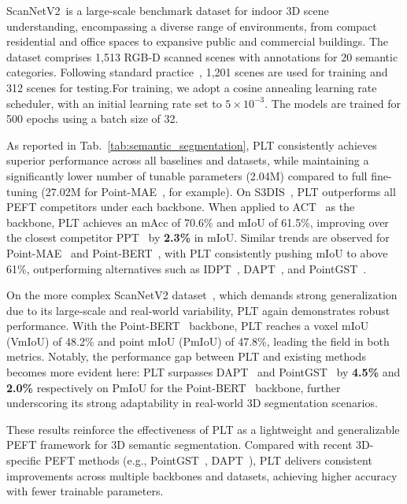 ScanNetV2~\cite{dai2017scannet}is a large-scale benchmark dataset for indoor 3D scene understanding, encompassing a diverse range of environments, from compact residential and office spaces to expansive public and commercial buildings. The dataset comprises 1,513 RGB-D scanned scenes with annotations for 20 semantic categories. Following standard practice~\cite{dai2017scannet}, 1,201 scenes are used for training and 312 scenes for testing.For training, we adopt a cosine annealing learning rate scheduler, with an initial learning rate set to $5 \times 10^{-3}$. The models are trained for 500 epochs using a batch size of 32.

As reported in Tab.~\ref{tab:semantic_segmentation}, PLT consistently achieves superior performance across all baselines and datasets, while maintaining a significantly lower number of tunable parameters (2.04M) compared to full fine-tuning (27.02M for Point-MAE~\cite{pang2022masked}, for example). On S3DIS~\cite{armeni20163d}, PLT outperforms all PEFT competitors under each backbone. When applied to ACT~\cite{dong2022autoencoders} as the backbone, PLT achieves an mAcc of 70.6\% and mIoU of 61.5\%, improving over the closest competitor PPT~\cite{zhang2024positional} by \textbf{2.3\%} in mIoU. Similar trends are observed for Point-MAE~\cite{pang2022masked} and Point-BERT~\cite{yu2022point}, with PLT consistently pushing mIoU to above 61\%, outperforming alternatives such as IDPT~\cite{zha2023instance}, DAPT~\cite{zhou2024dynamic}, and PointGST~\cite{liang2024parameter}.

On the more complex ScanNetV2 dataset~\cite{dai2017scannet}, which demands strong generalization due to its large-scale and real-world variability, PLT again demonstrates robust performance. With the Point-BERT~\cite{yu2022point} backbone, PLT reaches a voxel mIoU (VmIoU) of 48.2\% and point mIoU (PmIoU) of 47.8\%, leading the field in both metrics. Notably, the performance gap between PLT and existing methods becomes more evident here: PLT surpasses DAPT~\cite{zhou2024dynamic} and PointGST~\cite{liang2024parameter} by \textbf{4.5\%} and \textbf{2.0\%} respectively on PmIoU for the Point-BERT~\cite{yu2022point} backbone, further underscoring its strong adaptability in real-world 3D segmentation scenarios.

These results reinforce the effectiveness of PLT as a lightweight and generalizable PEFT framework for 3D semantic segmentation. Compared with recent 3D-specific PEFT methods (e.g., PointGST~\cite{liang2024parameter}, DAPT~\cite{zhou2024dynamic}), PLT delivers consistent improvements across multiple backbones and datasets, achieving higher accuracy with fewer trainable parameters. 

